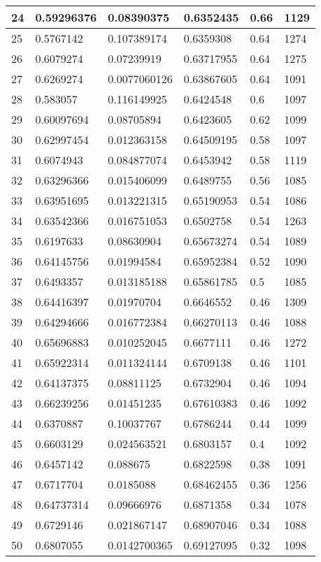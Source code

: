 \begin{longtable}{|l|l|l|l|l|l|}
24 & 0.59296376 & 0.08390375 & 0.6352435 & 0.66 & 1129 \\ \hline 
25 & 0.5767142 & 0.107389174 & 0.6359308 & 0.64 & 1274 \\ \hline 
26 & 0.6079274 & 0.07239919 & 0.63717955 & 0.64 & 1275 \\ \hline 
27 & 0.6269274 & 0.0077060126 & 0.63867605 & 0.64 & 1091 \\ \hline 
28 & 0.583057 & 0.116149925 & 0.6424548 & 0.6 & 1097 \\ \hline 
29 & 0.60097694 & 0.08705894 & 0.6423605 & 0.62 & 1099 \\ \hline 
30 & 0.62997454 & 0.012363158 & 0.64509195 & 0.58 & 1097 \\ \hline 
31 & 0.6074943 & 0.084877074 & 0.6453942 & 0.58 & 1119 \\ \hline 
32 & 0.63296366 & 0.015406099 & 0.6489755 & 0.56 & 1085 \\ \hline 
33 & 0.63951695 & 0.013221315 & 0.65190953 & 0.54 & 1086 \\ \hline 
34 & 0.63542366 & 0.016751053 & 0.6502758 & 0.54 & 1263 \\ \hline 
35 & 0.6197633 & 0.08630904 & 0.65673274 & 0.54 & 1089 \\ \hline 
36 & 0.64145756 & 0.01994584 & 0.65952384 & 0.52 & 1090 \\ \hline 
37 & 0.6493357 & 0.013185188 & 0.65861785 & 0.5 & 1085 \\ \hline 
38 & 0.64416397 & 0.01970704 & 0.6646552 & 0.46 & 1309 \\ \hline 
39 & 0.64294666 & 0.016772384 & 0.66270113 & 0.46 & 1088 \\ \hline 
40 & 0.65696883 & 0.010252045 & 0.6677111 & 0.46 & 1272 \\ \hline 
41 & 0.65922314 & 0.011324144 & 0.6709138 & 0.46 & 1101 \\ \hline 
42 & 0.64137375 & 0.08811125 & 0.6732904 & 0.46 & 1094 \\ \hline 
43 & 0.66239256 & 0.01451235 & 0.67610383 & 0.46 & 1092 \\ \hline 
44 & 0.6370887 & 0.10037767 & 0.6786244 & 0.44 & 1099 \\ \hline 
45 & 0.6603129 & 0.024563521 & 0.6803157 & 0.4 & 1092 \\ \hline 
46 & 0.6457142 & 0.088675 & 0.6822598 & 0.38 & 1091 \\ \hline 
47 & 0.6717704 & 0.0185088 & 0.68462455 & 0.36 & 1256 \\ \hline 
48 & 0.64737314 & 0.09666976 & 0.6871358 & 0.34 & 1078 \\ \hline 
49 & 0.6729146 & 0.021867147 & 0.68907046 & 0.34 & 1088 \\ \hline 
50 & 0.6807055 & 0.0142700365 & 0.69127095 & 0.32 & 1098 \\ \hline 
\end{longtable}